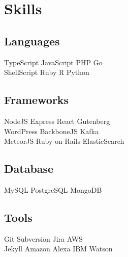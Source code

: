 \documentclass[]{deedy-resume-openfont}
\begin{document}
\begin{minipage}[t]{0.33\textwidth}

\section{Skills}
\subsection{Languages}
TypeScript \textbullet{} JavaScript \textbullet{} PHP \textbullet{} Go \\
ShellScript \textbullet{} Ruby \textbullet{} R \textbullet{} Python
\sectionsep
\sectionsep

\subsection{Frameworks}
NodeJS \textbullet{} Express \textbullet{} React \textbullet{} Gutenberg \\
WordPress \textbullet{} BackboneJS \textbullet{} Kafka \\
MeteorJS \textbullet{} Ruby on Rails \textbullet{} ElasticSearch
\sectionsep
\sectionsep

\subsection{Database}
MySQL \textbullet{} PostgreSQL \textbullet{} MongoDB
\sectionsep
\sectionsep

\subsection{Tools}
Git \textbullet{} Subversion \textbullet{} Jira \textbullet{} AWS \\
Jekyll \textbullet{} Amazon Alexa \textbullet{} IBM Watson
\sectionsep




\end{minipage}
\end{document}
